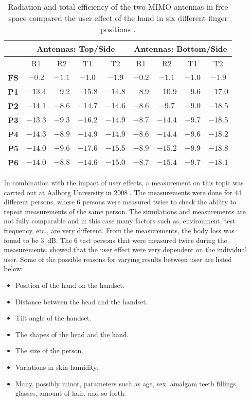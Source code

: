 \begin{table}[htbp]
\centering
\begin{tabular}{|c|c|c|c|c|c|c|c|c|}
\hline
            & \multicolumn{4}{c|}{\textbf{Antennas: Top/Side}} & \multicolumn{4}{c|}{\textbf{Antennas: Bottom/Side}} \\ \hline
             & R1      & R2     & T1      & T2      & R1     & R2      & T1     & T2          \\ \hline
\textbf{FS}  & $-0.2 $ & $-1.1$ & $-1.0 $ & $-1.9 $ & $-0.2$ & $-1.1 $ & $-1.0$ & $-1.9 $       \\ \hline
\textbf{P1}  & $-13.4$ & $-9.2$ & $-15.8$ & $-14.8$ & $-8.9$ & $-10.9$ & $-9.6$ & $-17.0$       \\ \hline
\textbf{P2}  & $-14.1$ & $-8.6$ & $-14.7$ & $-14.6$ & $-8.6$ & $-9.7 $ & $-9.0$ & $-18.5$       \\ \hline
\textbf{P3}  & $-13.3$ & $-9.3$ & $-16.2$ & $-14.9$ & $-8.7$ & $-14.4$ & $-9.7$ & $-18.5$       \\ \hline
\textbf{P4}  & $-14.3$ & $-8.9$ & $-14.9$ & $-14.9$ & $-8.6$ & $-14.4$ & $-9.6$ & $-18.2$       \\ \hline
\textbf{P5}  & $-14.0$ & $-9.6$ & $-17.6$ & $-15.5$ & $-8.9$ & $-15.2$ & $-9.9$ & $-18.8$       \\ \hline
\textbf{P6}  & $-14.0$ & $-8.8$ & $-14.6$ & $-15.0$ & $-8.7$ & $-15.4$ & $-9.7$ & $-18.1$       \\ \hline
\end{tabular}
\caption{Radiation and total efficiency of the two MIMO antennas in free space compared the user effect of the hand in six different finger positions \cite{Samantha2014UserEff}.}
\label{tab:usereff_radeff}
\end{table}

In combination with the impact of user effects, a measurement on this topic was carried out at Aalborg University in 2008 \cite{sanchez2008multiband}.
The measurements were done for 44 different persons, where 6 persons were measured twice to check the ability to repeat measurements of the same person.  
The simulations and measurements are not fully comparable and in this case many factors such as, environment, test frequency, etc., are very different. From the measurements, the body loss was found to be \SI{3}{dB}. The 6 test persons that were measured twice during the measurements, showed that the user effect were very dependent on the individual user. 
Some of the possible reasons for varying results between user are listed below:
\begin{itemize}
\item Position of the hand on the handset.
\item Distance between the head and the handset.
\item Tilt angle of the handset.
\item The shapes of the head and the hand.
\item The size of the person.
\item Variations in skin humidity.
\item Many, possibly minor, parameters such as age, sex, amalgam teeth fillings, glasses, amount of hair, and so forth.
\end{itemize}

